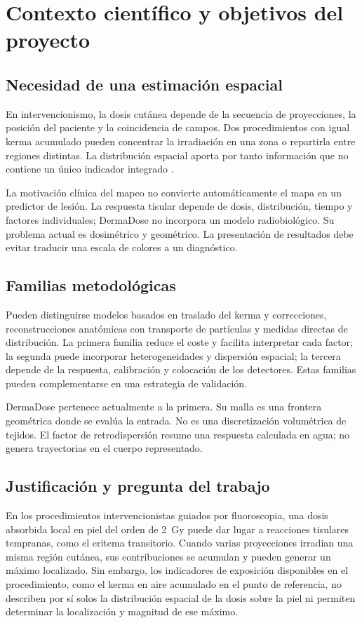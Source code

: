 \chapter{Contexto científico y objetivos del proyecto}
\label{chap:contexto_objetivos}
\section{Necesidad de una estimación espacial}
En intervencionismo, la dosis cutánea depende de la secuencia de proyecciones, la posición del paciente y la coincidencia de campos. Dos procedimientos con igual kerma acumulado pueden concentrar la irradiación en una zona o repartirla entre regiones distintas. La distribución espacial aporta por tanto información que no contiene un único indicador integrado \citep{aapm2021,malchair2020}.

La motivación clínica del mapeo no convierte automáticamente el mapa en un predictor de lesión. La respuesta tisular depende de dosis, distribución, tiempo y factores individuales; DermaDose no incorpora un modelo radiobiológico. Su problema actual es dosimétrico y geométrico. La presentación de resultados debe evitar traducir una escala de colores a un diagnóstico.


\section{Familias metodológicas}
Pueden distinguirse modelos basados en traslado del kerma y correcciones, reconstrucciones anatómicas con transporte de partículas y medidas directas de distribución. La primera familia reduce el coste y facilita interpretar cada factor; la segunda puede incorporar heterogeneidades y dispersión espacial; la tercera depende de la respuesta, calibración y colocación de los detectores. Estas familias pueden complementarse en una estrategia de validación.

DermaDose pertenece actualmente a la primera. Su malla es una frontera geométrica donde se evalúa la entrada. No es una discretización volumétrica de tejidos. El factor de retrodispersión resume una respuesta calculada en agua; no genera trayectorias en el cuerpo representado.




\section{Justificación y pregunta del trabajo}

En los procedimientos intervencionistas guiados por fluoroscopia, una dosis absorbida local en piel del orden de 2~Gy puede dar lugar a reacciones tisulares tempranas, como el eritema transitorio. Cuando varias proyecciones irradian una misma región cutánea, sus contribuciones se acumulan y pueden generar un máximo localizado. Sin embargo, los indicadores de exposición disponibles en el procedimiento, como el kerma en aire acumulado en el punto de referencia, no describen por sí solos la distribución espacial de la dosis sobre la piel ni permiten determinar la localización y magnitud de ese máximo.

